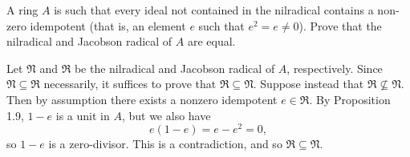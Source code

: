 \begin{exercise}
A ring \(A\) is such that every ideal not contained in the nilradical contains a non-zero idempotent (that is, an element \(e\) such that \(e^2 = e \neq 0\)).
Prove that the nilradical and Jacobson radical of \(A\) are equal.
\end{exercise}

\begin{solution}
Let \(\mathfrak N\) and \(\mathfrak R\) be the nilradical and Jacobson radical of \(A\), respectively.
Since \(\mathfrak N \subseteq \mathfrak R\) necessarily, it suffices to prove that \(\mathfrak R \subseteq \mathfrak N\).
Suppose instead that \(\mathfrak R \not\subseteq \mathfrak N\).
Then by assumption there exists a nonzero idempotent \(e \in \mathfrak R\).
By Proposition 1.9, \(1-e\) is a unit in \(A\), but we also have
\begin{equation*}
e(1-e)=e-e^2 = 0,
\end{equation*}
so \(1 - e\) is a zero-divisor.
This is a contradiction, and so \(\mathfrak R \subseteq \mathfrak N\).
\end{solution}